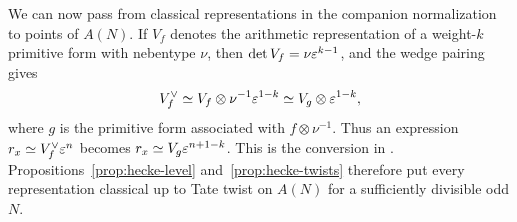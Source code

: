 We can now pass from classical representations in the companion
normalization to points of $A(N)$.  If $V_f$ denotes the arithmetic representation of a
weight-$k$ primitive form with nebentype $\nu$, then
$\det V_f=\nu\varepsilon^{k-1}$, and the wedge pairing gives
\begin{equation}\label{eq:classical-dual-conversion}
 V_f^\vee\simeq V_f\otimes\nu^{-1}\varepsilon^{1-k}
       \simeq V_g\otimes\varepsilon^{1-k},
\end{equation}
where $g$ is the primitive form associated with
$f\otimes\nu^{-1}$.  Thus an expression
$r_x\simeq V_f^\vee\varepsilon^n$ becomes
$r_x\simeq V_g\varepsilon^{n+1-k}$.
This is the conversion in \cite[Section~2.1]{FM2}.
Propositions~\ref{prop:hecke-level} and~\ref{prop:hecke-twists}
therefore put every representation classical up to Tate twist
on $A(N)$ for a sufficiently divisible odd $N$.
